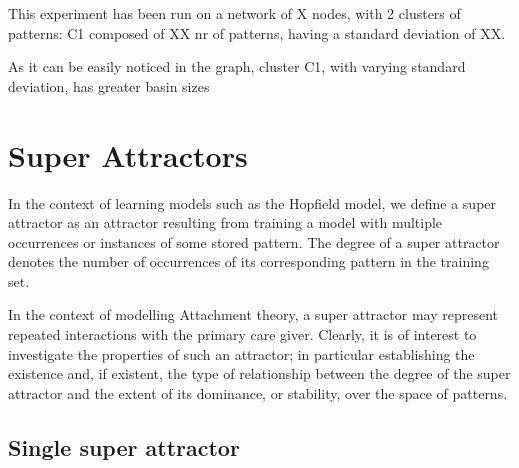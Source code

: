 This experiment has been run on a network of X nodes, with 2 clusters of patterns: C1 composed of XX nr of patterns, having a standard deviation of XX.

As it can be easily noticed in the graph, cluster C1, with varying standard deviation, has greater basin sizes


\section{Super Attractors}
\label{super_attractors}
In the context of learning models such as the Hopfield model, we define a super attractor as an attractor resulting from training a model with multiple occurrences or instances of some stored pattern. The degree of a super attractor denotes the number of occurrences of its corresponding pattern in the training set.


In the context of modelling Attachment theory, a super attractor may represent repeated interactions with the primary care giver. Clearly, it is of interest to investigate the properties of such an attractor; in particular establishing the existence and, if existent, the type of relationship between the degree of the super attractor and the extent of its dominance, or stability, over the space of patterns.


\subsection{Single super attractor}

\newcommand{\psuper}{$p_{super}$}
\newcommand{\prandom}{$\overrightarrow{p}_{random}$}

